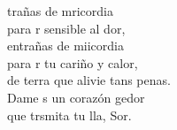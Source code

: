 \documentclass[12pt]{article}
\begin{document}
\begin{multicols*}{2}
\begin{cancion}%
	trañas de mricordia\\
	para r sensible al dor,\\
	entrañas de miicordia\\
	para r tu cariño y calor,\\
	de terra que alivie tans penas.\\
	Dame s un corazón gedor\\
	que trsmita tu lla, Sor.\\
\end{cancion}%


\end{multicols*}
\end{document}
